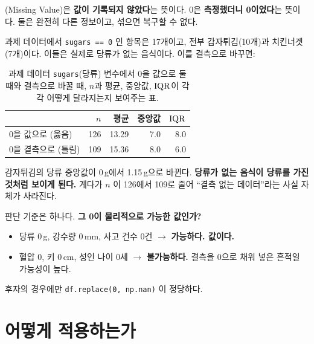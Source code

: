(Missing Value)은 \textbf{값이 기록되지 않았다}는 뜻이다. 0은
\textbf{측정했더니 0이었다}는 뜻이다. 둘은 완전히 다른 정보이고, 섞으면 복구할
수 없다.

\begin{example}
\label{ex:zero-as-missing}
과제 데이터에서 \texttt{sugars == 0} 인 항목은 17개이고, 전부 감자튀김(10개)과
치킨너겟(7개)이다. 이들은 실제로 당류가 없는 음식이다. 이를 결측으로 바꾸면:

\begin{table}[H]\centering
\caption{과제 데이터 \texttt{sugars}(당류) 변수에서 0을 값으로 둘 때와
결측으로 바꿀 때, $n$과 평균, 중앙값, $\mathrm{IQR}$이 각각 어떻게 달라지는지
보여주는 표.}
\label{tab:desc-zero-as-missing}
\begin{tabular}{@{}lrrrr@{}}
\toprule
 & $n$ & 평균 & 중앙값 & $\mathrm{IQR}$ \\
\midrule
0을 값으로 (옳음)   & 126 & 13.29 & 7.0 & 8.0 \\
\midrule
0을 결측으로 (틀림) & 109 & 15.36 & 8.0 & 6.0 \\
\bottomrule
\end{tabular}
\end{table}

감자튀김의 당류 중앙값이 0\,g에서 1.15\,g으로 바뀐다. \textbf{당류가 없는
음식이 당류를 가진 것처럼 보이게 된다.} 게다가 $n$ 이 126에서 109로 줄어
``결측 없는 데이터''라는 사실 자체가 사라진다.
\end{example}

\begin{keyidea}
판단 기준은 하나다. \textbf{그 0이 물리적으로 가능한 값인가?}

\begin{itemize}
  \item 당류 0\,g, 강수량 0\,mm, 사고 건수 0건 $\rightarrow$ \textbf{가능하다. 값이다.}
  \item 혈압 0, 키 0\,cm, 성인 나이 0세 $\rightarrow$ \textbf{불가능하다.} 결측을
        0으로 채워 넣은 흔적일 가능성이 높다.
\end{itemize}

후자의 경우에만 \verb|df.replace(0, np.nan)| 이 정당하다.
\end{keyidea}

\section{어떻게 적용하는가}
\label{sec:desc-apply}

